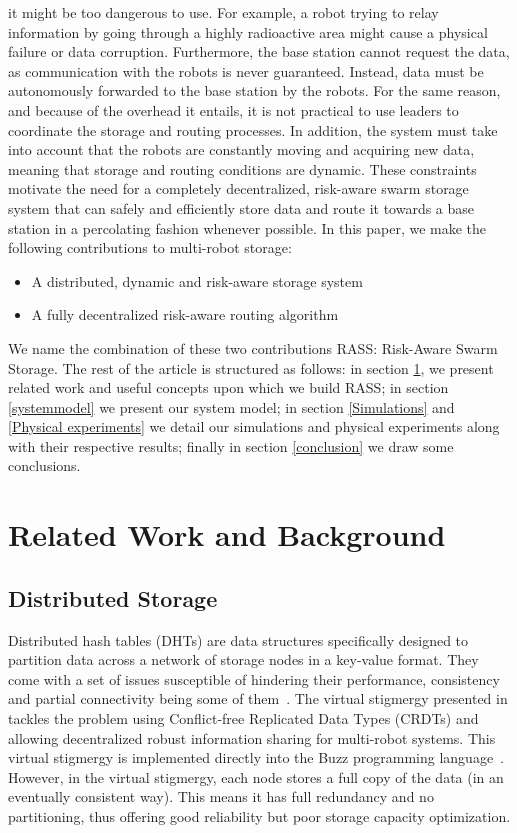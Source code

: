 \documentclass[letterpaper, 10 pt, conference]{ieeeconf}
\begin{document}
it might be too dangerous to use. For example, a robot trying to relay
information by going through a highly radioactive area might cause a
physical failure or data corruption. Furthermore, the base station
cannot request the data, as communication with the robots is
never guaranteed. Instead, data must be autonomously forwarded to the base station
by the robots. For the same reason, and because of the overhead it
entails, it is not practical to use leaders to coordinate the storage
and routing processes. In addition, the system must take into account 
that the robots are constantly moving and acquiring new data,
meaning that storage and routing conditions are dynamic. These
constraints motivate the need for a completely decentralized,
risk-aware swarm storage system that can safely and efficiently store
data and route it towards a base station in a percolating fashion
whenever possible. In this paper, we make the following contributions
to multi-robot storage:

\begin{itemize}
    \item A distributed, dynamic and risk-aware storage system
    \item A fully decentralized risk-aware routing algorithm
\end{itemize}

We name the combination of these two contributions RASS: Risk-Aware Swarm Storage.
The rest of the article is structured as follows: in section \ref{relatedwork}, we
present related work and useful concepts upon which we build RASS; in section \ref{systemmodel} we present our system model; in section \ref{Simulations} and \ref{Physical experiments} we
detail our simulations and physical experiments along with their respective results; finally in section \ref{conclusion} we
draw some conclusions.

\section{Related Work and Background}
\label{relatedwork}

\subsection{Distributed Storage}

Distributed hash tables (DHTs) are data structures specifically
designed to partition data across a network of storage nodes in a
key-value format. They come with a set of issues susceptible of
hindering their performance, consistency and partial connectivity
being some of them~\cite{amigoni2017multirobot}. The virtual stigmergy
presented in \cite{pinciroliTuple2016} tackles the problem using
Conflict-free Replicated Data Types (CRDTs) and allowing decentralized
robust information sharing for multi-robot systems. This virtual
stigmergy is implemented directly into the Buzz programming
language~\cite{pinciroliBuzz2016}. However, in the virtual stigmergy,
each node stores a full copy of the data (in an eventually consistent
way). This means it has full redundancy and no partitioning, thus
offering good reliability but poor storage capacity optimization.
\end{document}
